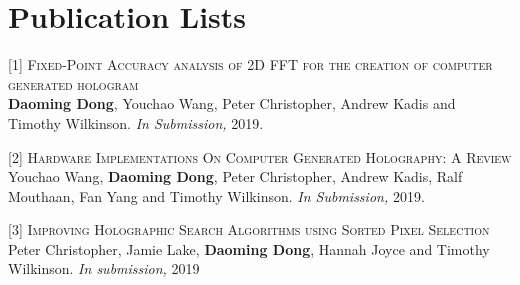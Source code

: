 \documentclass[11pt,a4paper,roman]{moderncv}        %
\begin{document}
\section{Publication Lists}
[1] \textsc{Fixed-Point Accuracy analysis of 2D FFT for the creation of computer generated hologram}\\
\textbf{Daoming Dong}, Youchao Wang, Peter Christopher, Andrew Kadis and Timothy Wilkinson. \textit{In Submission,} 2019.


[2] \textsc{Hardware Implementations On Computer Generated Holography: A Review}\\
Youchao Wang, \textbf{Daoming Dong}, Peter Christopher, Andrew Kadis, Ralf Mouthaan, Fan Yang and Timothy Wilkinson. \textit{In Submission,} 2019.




[3] \textsc{Improving Holographic Search Algorithms using Sorted Pixel Selection}\\
Peter Christopher, Jamie Lake, \textbf{Daoming Dong}, Hannah Joyce and Timothy Wilkinson. \textit{In submission,} 2019
\end{document}
